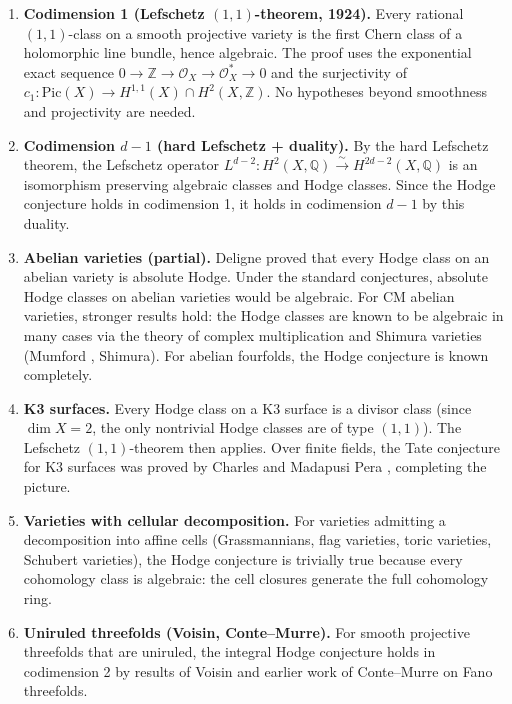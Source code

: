 \documentclass[11pt]{article}
\theoremstyle{definition}
\begin{document}
\begin{enumerate}[label=(\roman*)]
  \item \textbf{Codimension 1 (Lefschetz $(1,1)$-theorem, 1924).}
    Every rational $(1,1)$-class on a smooth projective variety is the first
    Chern class of a holomorphic line bundle, hence algebraic.  The proof
    uses the exponential exact sequence
    $0 \to \mathbb{Z} \to \mathcal{O}_X \to \mathcal{O}_X^* \to 0$
    and the surjectivity of $c_1 : \mathrm{Pic}(X) \to H^{1,1}(X) \cap
    H^2(X, \mathbb{Z})$.  No hypotheses beyond smoothness and projectivity
    are needed.

  \item \textbf{Codimension $d-1$ (hard Lefschetz + duality).}
    By the hard Lefschetz theorem, the Lefschetz operator
    $L^{d-2} : H^2(X, \mathbb{Q}) \xrightarrow{\sim} H^{2d-2}(X, \mathbb{Q})$
    is an isomorphism preserving algebraic classes and Hodge classes.
    Since the Hodge conjecture holds in codimension 1, it holds in
    codimension $d-1$ by this duality.

  \item \textbf{Abelian varieties (partial).}
    Deligne \cite{Deligne} proved that every Hodge class on an abelian
    variety is absolute Hodge.  Under the standard conjectures, absolute
    Hodge classes on abelian varieties would be algebraic.  For CM abelian
    varieties, stronger results hold: the Hodge classes are known to be
    algebraic in many cases via the theory of complex multiplication and
    Shimura varieties (Mumford \cite{Mumford}, Shimura).  For abelian
    fourfolds, the Hodge conjecture is known completely.

  \item \textbf{K3 surfaces.}
    Every Hodge class on a K3 surface is a divisor class (since $\dim X = 2$,
    the only nontrivial Hodge classes are of type $(1,1)$).  The Lefschetz
    $(1,1)$-theorem then applies.  Over finite fields, the Tate conjecture for
    K3 surfaces was proved by Charles \cite{Charles} and Madapusi Pera
    \cite{MP}, completing the picture.

  \item \textbf{Varieties with cellular decomposition.}
    For varieties admitting a decomposition into affine cells (Grassmannians,
    flag varieties, toric varieties, Schubert varieties), the Hodge conjecture
    is trivially true because every cohomology class is algebraic: the
    cell closures generate the full cohomology ring.

  \item \textbf{Uniruled threefolds (Voisin, Conte--Murre).}
    For smooth projective threefolds that are uniruled, the integral Hodge
    conjecture holds in codimension 2 by results of Voisin
    \cite{Voisin-integral} and earlier work of Conte--Murre on Fano
    threefolds.
\end{enumerate}
\end{document}
